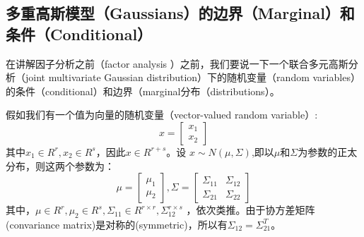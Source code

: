 \documentclass[14pt,a4paper]{article}
\begin{document}
\subsection{多重高斯模型（Gaussians）的边界（Marginal）和条件（Conditional）}
\begin{spacing}{1.5}

\quad \quad 在讲解因子分析之前（factor analysis ）之前，我们要说一下一个联合多元高斯分析（joint multivariate Gaussian distribution）下的随机变量（random variables）的条件（conditional）和边界（marginal分布（distributions）。

假如我们有一个值为向量的随机变量（vector-valued random variable）:
$$
x=\begin{bmatrix}
x_1 \\ x_2
\end{bmatrix}
$$
其中$x_1\in R^{r},x_2\in R^{s}$，因此$x\in R^{r+s}$。设 $x\sim N(\mu ,\Sigma)$,即以$\mu$和$\Sigma$为参数的正太分布，则这两个参数为：
$$
\mu=\begin{bmatrix}
\mu_1\\\mu_2
\end{bmatrix}
,
\Sigma=\begin{bmatrix}
\Sigma_{11} &\Sigma_{12} \\ \Sigma_{21} &\Sigma_{22}
\end{bmatrix}
$$
其中，$\mu\in R^{r},\mu_2\in R^{s},\Sigma_{11}\in R^{r\times r},\Sigma_{12}^{r\times s}$ ，依次类推。由于协方差矩阵(convariance matrix)是对称的(symmetric)，所以有$\Sigma_{12}=\Sigma_{21}^{T}$。


\end{spacing}
\end{document}
